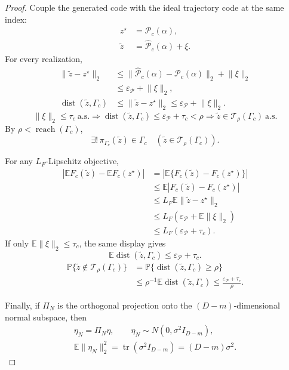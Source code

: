 \documentclass[preprint,12pt,number]{elsarticle}
\begin{document}
\begin{proof}
	Couple the generated code with the ideal trajectory code at the same index:
	\[
	\begin{aligned}
	z^\star&=\mathcal{P}_c(\alpha),\\
	\tilde z&=\widehat{\mathcal{P}}_c(\alpha)+\xi .
	\end{aligned}
	\]
	For every realization,
	\[
	\begin{aligned}
	\lVert \tilde z-z^\star\rVert_2
	&\le
	\lVert\widehat{\mathcal{P}}_c(\alpha)-\mathcal{P}_c(\alpha)\rVert_2+\lVert\xi\rVert_2\\
	&\le \varepsilon_{\mathcal{P}}+\lVert\xi\rVert_2,\\
	\operatorname{dist}(\tilde z,\Gamma_c)
	&\le \lVert \tilde z-z^\star\rVert_2
	\le \varepsilon_{\mathcal{P}}+\lVert\xi\rVert_2 .
	\end{aligned}
	\]
	\[
	\lVert\xi\rVert_2\le\tau_c\ \mathrm{a.s.}
	\Longrightarrow
	\operatorname{dist}(\tilde z,\Gamma_c)
	\le \varepsilon_{\mathcal{P}}+\tau_c
	<\rho
	\Longrightarrow
	\tilde z\in\mathcal{T}_\rho(\Gamma_c)\ \mathrm{a.s.}
	\]
	By $\rho<\operatorname{reach}(\Gamma_c)$,
	\[
	\exists!\,\pi_{\Gamma_c}(\tilde z)\in\Gamma_c
	\quad
	(\tilde z\in\mathcal{T}_\rho(\Gamma_c)).
	\]

	For any $L_F$-Lipschitz objective,
	\[
	\begin{aligned}
	\left|\mathbb{E}F_c(\tilde z)-\mathbb{E}F_c(z^\star)\right|
	&=
	\left|\mathbb{E}\{F_c(\tilde z)-F_c(z^\star)\}\right|\\
	&\le
	\mathbb{E}\left|F_c(\tilde z)-F_c(z^\star)\right|\\
	&\le
	L_F\mathbb{E}\lVert\tilde z-z^\star\rVert_2\\
	&\le
	L_F\left(\varepsilon_{\mathcal{P}}+\mathbb{E}\lVert\xi\rVert_2\right)\\
	&\le
	L_F(\varepsilon_{\mathcal{P}}+\tau_c).
	\end{aligned}
	\]
	If only $\mathbb{E}\lVert\xi\rVert_2\le\tau_c$, the same display gives
	\[
	\mathbb{E}\operatorname{dist}(\tilde z,\Gamma_c)
	\le
	\varepsilon_{\mathcal{P}}+\tau_c .
	\]
	\[
	\begin{aligned}
	\mathbb{P}\{\tilde z\notin\mathcal{T}_\rho(\Gamma_c)\}
	&=
	\mathbb{P}\{\operatorname{dist}(\tilde z,\Gamma_c)\ge\rho\}\\
	&\le
	\rho^{-1}\mathbb{E}\operatorname{dist}(\tilde z,\Gamma_c)
	\le
	\frac{\varepsilon_{\mathcal{P}}+\tau_c}{\rho}.
	\end{aligned}
	\]

	Finally, if $\Pi_N$ is the orthogonal projection onto the $(D-m)$-dimensional normal subspace, then
	\[
	\begin{gathered}
	\eta_N=\Pi_N\eta,\qquad
	\eta_N\sim N(0,\sigma^2 I_{D-m}),\\
	\mathbb{E}\lVert\eta_N\rVert_2^2
	=
	\operatorname{tr}(\sigma^2 I_{D-m})
	=
	(D-m)\sigma^2 .
	\end{gathered}
	\]
\end{proof}
\end{document}
